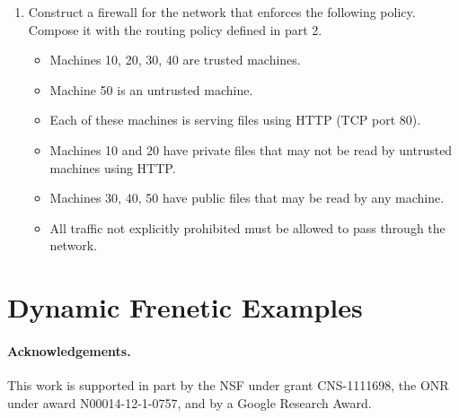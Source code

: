 \documentclass{article}
\begin{document}
\begin{enumerate}
\item Construct a firewall for the network that enforces the following policy.
Compose it with the routing policy defined in part 2.
\begin{itemize}
  \item Machines 10, 20, 30, 40 are trusted machines.  
  \item Machine 50 is an untrusted machine.  
  \item Each of these machines is serving files using HTTP (TCP port 80).  
  \item Machines 10 and 20 have private files that may not be read by untrusted machines using HTTP.  
  \item Machines 30, 40, 50 have public files that may be read by any machine.
  \item All traffic not explicitly prohibited must be allowed to pass through the network.
\end{itemize}
\end{enumerate}

\section{Dynamic Frenetic Examples}

\paragraph*{Acknowledgements.}
%
This work is supported in part by the NSF under grant
CNS-1111698, the ONR under award N00014-12-1-0757, and by a Google
Research Award.

{

}
\end{document}
